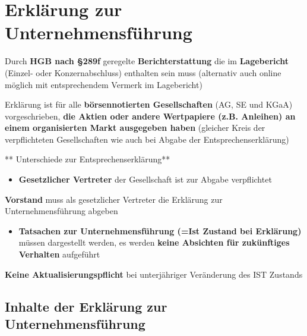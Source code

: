 \documentclass[
]{article}
\providecommand{\tightlist}{%
  \setlength{\itemsep}{0pt}\setlength{\parskip}{0pt}}
\begin{document}
\hypertarget{erkluxe4rung-zur-unternehmensfuxfchrung}{%
\section{Erklärung zur
Unternehmensführung}\label{erkluxe4rung-zur-unternehmensfuxfchrung}}

Durch \textbf{HGB nach §289f }geregelte \textbf{Berichterstattung }die
im \textbf{Lagebericht} (Einzel- oder Konzernabschluss) enthalten sein
muss (alternativ auch online möglich mit entsprechendem Vermerk im
Lagebericht)

Erklärung ist für alle \textbf{börsennotierten Gesellschaften} (AG, SE
und KGaA) vorgeschrieben, \textbf{die Aktien oder andere Wertpapiere
(z.B. Anleihen) an einem organisierten Markt ausgegeben haben} (gleicher
Kreis der verpflichteten Gesellschaften wie auch bei Abgabe der
Entsprechenserklärung)

** Unterschiede zur Entsprechenserklärung**

\begin{itemize}
\tightlist
\item
  \textbf{Gesetzlicher Vertreter} der Gesellschaft ist zur Abgabe
  verpflichtet
\end{itemize}

\textbf{Vorstand} muss als gesetzlicher Vertreter die Erklärung zur
Unternehmensführung abgeben

\begin{itemize}
\tightlist
\item
  \textbf{Tatsachen zur Unternehmensführung (=Ist Zustand bei
  Erklärung)} müssen dargestellt werden, es werden \textbf{keine
  Absichten für zukünftiges Verhalten} aufgeführt
\end{itemize}

\textbf{Keine Aktualisierungspflicht} bei unterjähriger Veränderung des
IST Zustands

\hypertarget{inhalte-der-erkluxe4rung-zur-unternehmensfuxfchrung}{%
\subsection{Inhalte der Erklärung zur
Unternehmensführung}\label{inhalte-der-erkluxe4rung-zur-unternehmensfuxfchrung}}
\end{document}
